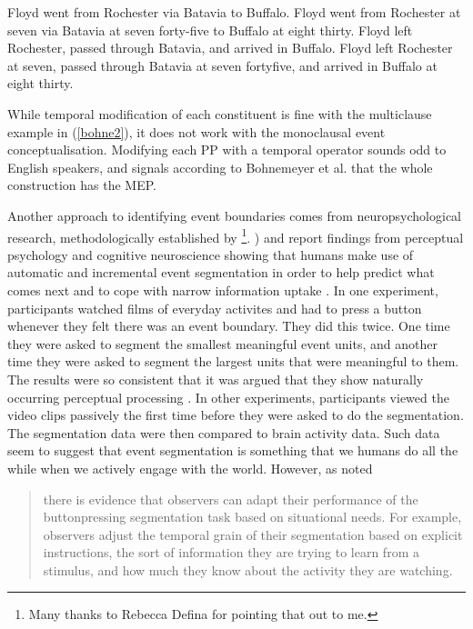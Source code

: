 \ea
\ea
\label{bohne1} Floyd went from Rochester via Batavia to Buffalo.
\ex *Floyd went from Rochester at seven via Batavia at seven forty-five to Buffalo at eight thirty.
\ex \label{bohne2} Floyd left Rochester, passed through Batavia, and arrived in Buffalo.
\ex Floyd left Rochester at seven, passed through Batavia at seven fortyfive, and arrived in Buffalo at eight thirty.
\z
\z

While temporal modification of each constituent is fine with the multiclause example in (\ref{bohne2}), it does not work with the monoclausal event conceptualisation. Modifying each PP with a temporal operator sounds odd to English speakers, and signals according to Bohnemeyer et al. that the whole construction has the MEP.

Another approach to identifying event boundaries comes from neuropsychological research, methodologically established by \textcite{newtson1976perceptual}\footnote{Many thanks to Rebecca Defina for pointing that out to me.}. \textcite{zacks2007event}) and \textcite{zacks2010we} report findings from perceptual psychology and cognitive neuroscience showing that humans make use of automatic and incremental event segmentation in order to help predict what comes next and to cope with narrow information uptake \citep{zacks2010we}. In one experiment, participants watched films of everyday activites and had to press a button whenever they felt there was an event boundary. They did this twice. One time they were asked to segment the smallest meaningful event units, and another time they were asked to segment the largest units that were meaningful to them. The results were so consistent that it was argued that they show naturally occurring perceptual processing \citep[80]{zacks2007event}. In other experiments, participants viewed the video clips passively the first time before they were asked to do the segmentation. The segmentation data were then compared to brain activity data. Such data seem to suggest that event segmentation is something that we humans do all the while when we actively engage with the world. However, as \citet[81]{zacks2007event} noted 

\begin{quote}there is evidence
that observers can adapt their performance of the buttonpressing
segmentation task based on situational needs. For
example, observers adjust the temporal grain of their segmentation
based on explicit instructions, the sort of information they
are trying to learn from a stimulus, and how much they know
about the activity they are watching.\end{quote}

